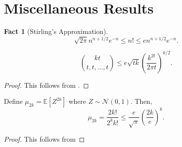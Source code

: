 \documentclass[final,12pt]{colt2018} %
\newcommand{\E}{\mathbb{E}}
\newcommand{\gauss}[2]{\mathcal{N}\left( #1,#2 \right)}
\newtheorem{fact}{Fact}
\begin{document}
\section{Miscellaneous Results}
\begin{fact}[Stirling's Approximation]
$$\sqrt{2\pi} n^{n+1/2} e^{-n} \leq n! \leq e n^{n+1/2} e^{-n}.$$
\label{fact: stirling}
\end{fact}
\begin{lemma}
$$\binom{kt}{t, t, \dotsc ,t} \leq e \sqrt{tk} \left( \frac{k^{2t}}{2\pi t} \right)^{k/2}.$$
\label{lemma: multinom_bound}
\end{lemma}
\begin{proof}
This follows from . 
\end{proof}
\begin{lemma} Define $\mu_{2k} = \E[Z^{2k}]$ where $Z \sim \gauss{0}{1}$. Then,
$$ \mu_{2k} = \frac{2k!}{2^k k!} \leq \frac{e}{\sqrt{\pi}} \left( \frac{2k}{e}\right)^k. $$
\label{lemma: gauss_moment_bound}
\end{lemma}
\begin{proof}
This follows from 
\end{proof}
\end{document}
